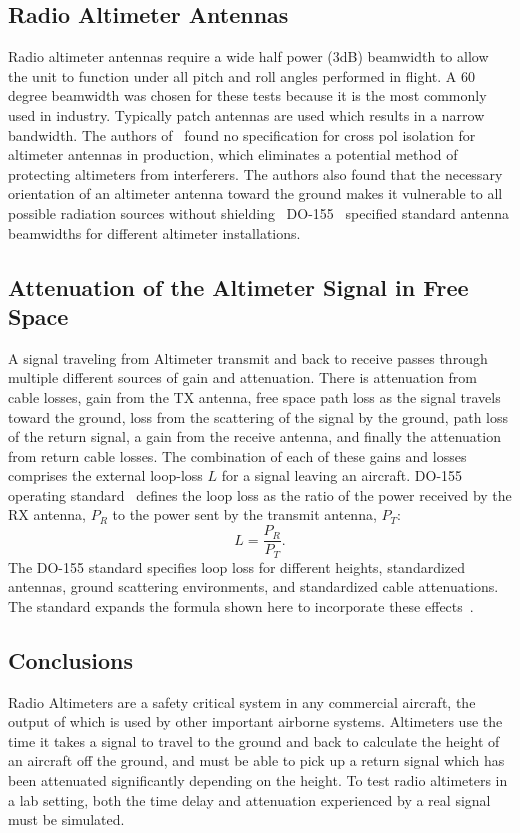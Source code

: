 \subsection{Radio Altimeter Antennas}
Radio altimeter antennas require a wide half power (3dB) beamwidth to allow the unit to function under all pitch and roll angles performed in flight. A 60 degree beamwidth was chosen for these tests because it is the most commonly used in industry. Typically patch antennas are used which results in a narrow bandwidth. The authors of~\cite{noauthor_operational_2014} found no specification for cross pol isolation for altimeter antennas in production, which eliminates a potential method of protecting altimeters from interferers. The authors also found that the necessary orientation of an altimeter antenna toward the ground makes it vulnerable to all possible radiation sources without shielding~\cite{noauthor_operational_2014} DO-155~\cite{noauthor_minimum_1974} specified standard antenna beamwidths for different altimeter installations. 

\subsection{Attenuation of the Altimeter Signal in Free Space}
A signal traveling from Altimeter transmit and back to receive passes through multiple different sources of gain and attenuation. There is attenuation from cable losses, gain from the TX antenna, free space path loss as the signal travels toward the ground, loss from the scattering of the signal by the ground, path loss of the return signal, a gain from the receive antenna, and finally the attenuation from return cable losses. The combination of each of these gains and losses comprises the external loop-loss $L$ for a signal leaving an aircraft. DO-155 operating standard~\cite{noauthor_minimum_1974} defines the loop loss as the ratio of the power received by the RX antenna, $P_R$ to the power sent by the transmit antenna, $P_T$:
$$ L = \frac{P_R}{P_T}.$$
The DO-155 standard specifies loop loss for different heights, standardized antennas,  ground scattering environments, and standardized cable attenuations. The standard expands the formula shown here to incorporate these effects~\cite{noauthor_minimum_1974}.

\subsection{Conclusions}
Radio Altimeters are a safety critical system in any commercial aircraft, the output of which is used by other important airborne systems. Altimeters use the time it takes a signal to travel to the ground and back to calculate the height of an aircraft off the ground, and must be able to pick up a return signal which has been attenuated significantly depending on the height. To test radio altimeters in a lab setting, both the time delay and attenuation experienced by a real signal must be simulated. 

